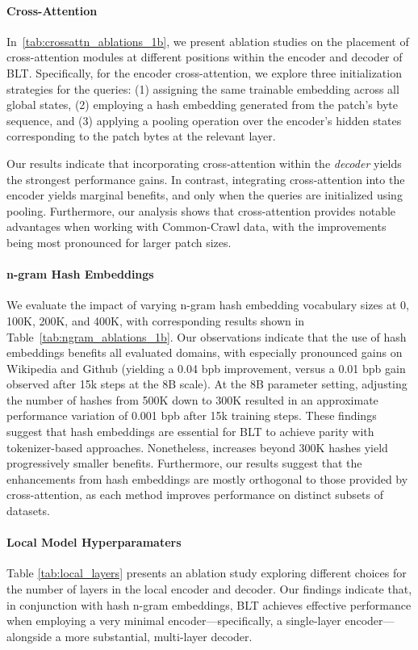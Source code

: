 \paragraph{Cross-Attention} 
In~\autoref{tab:crossattn_ablations_1b}, we present ablation studies on the placement of cross-attention modules at different positions within the encoder and decoder of {\textsc BLT}. Specifically, for the encoder cross-attention, we explore three initialization strategies for the queries: (1) assigning the same trainable embedding across all global states, (2) employing a hash embedding generated from the patch's byte sequence, and (3) applying a pooling operation over the encoder's hidden states corresponding to the patch bytes at the relevant layer.

Our results indicate that incorporating cross-attention within the \textit{decoder} yields the strongest performance gains. In contrast, integrating cross-attention into the encoder yields marginal benefits, and only when the queries are initialized using pooling. Furthermore, our analysis shows that cross-attention provides notable advantages when working with Common-Crawl data, with the improvements being most pronounced for larger patch sizes.

\paragraph{n-gram Hash Embeddings} 

We evaluate the impact of varying n-gram hash embedding vocabulary sizes at 0, 100K, 200K, and 400K, with corresponding results shown in Table~\ref{tab:ngram_ablations_1b}. Our observations indicate that the use of hash embeddings benefits all evaluated domains, with especially pronounced gains on Wikipedia and Github (yielding a 0.04 bpb improvement, versus a 0.01 bpb gain observed after 15k steps at the 8B scale). At the 8B parameter setting, adjusting the number of hashes from 500K down to 300K resulted in an approximate performance variation of 0.001 bpb after 15k training steps. These findings suggest that hash embeddings are essential for {\textsc BLT} to achieve parity with tokenizer-based approaches. Nonetheless, increases beyond 300K hashes yield progressively smaller benefits. Furthermore, our results suggest that the enhancements from hash embeddings are mostly orthogonal to those provided by cross-attention, as each method improves performance on distinct subsets of datasets.

\paragraph{Local Model Hyperparamaters} Table \ref{tab:local_layers} presents an ablation study exploring different choices for the number of layers in the local encoder and decoder. Our findings indicate that, in conjunction with hash n-gram embeddings, {\textsc BLT} achieves effective performance when employing a very minimal encoder—specifically, a single-layer encoder—alongside a more substantial, multi-layer decoder.

